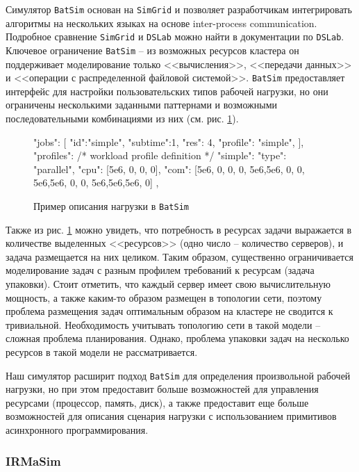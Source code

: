 Симулятор \texttt{BatSim} основан на \texttt{SimGrid}\cite{simgrid-article} и позволяет разработчикам интегрировать алгоритмы на нескольких языках на основе inter-process communication. Подробное сравнение \texttt{SimGrid} и \texttt{DSLab} можно найти в документации по \texttt{DSLab}\cite{dslab-analog-cmp}. Ключевое ограничение \texttt{BatSim} -- из возможных ресурсов кластера он поддерживает моделирование только <<вычисления>>, <<передачи данных>> и <<операции с распределенной файловой системой>>. \texttt{BatSim} предоставляет интерфейс для настройки пользовательских типов рабочей нагрузки, но они ограничены несколькими заданными паттернами и возможными последовательными комбинациями из них (см. рис. \ref{fig:batsim-profile}). 

\begin{figure}[h]
    \footnotesize  
\begin{jsoncode}
"jobs": [
  {"id":"simple", "subtime":1, "res": 4, "profile": "simple"},
],
"profiles": {
  /* workload profile definition */
  "simple": {
    "type": "parallel",
    "cpu": [5e6,  0,  0,  0],
    "com": [5e6,  0,  0,  0,
            5e6,5e6,  0,  0,
            5e6,5e6,  0,  0,
            5e6,5e6,5e6,  0]
  },
}
\end{jsoncode}
\caption{Пример описания нагрузки в \texttt{BatSim}}
\label{fig:batsim-profile}
\end{figure}

Также из рис. \ref{fig:batsim-profile} можно увидеть, что потребность в ресурсах задачи выражается в количестве выделенных <<ресурсов>> (одно число -- количество серверов), и задача размещается на них целиком. Таким образом, существенно ограничивается моделирование задач с разным профилем требований к ресурсам (задача упаковки). Стоит отметить, что каждый сервер имеет свою вычислительную мощность, а также каким-то образом размещен в топологии сети, поэтому проблема размещения задач оптимальным образом на кластере не сводится к тривиальной. Необходимость учитывать топологию сети в такой модели -- сложная проблема планирования. Однако, проблема упаковки задач на несколько ресурсов в такой модели не рассматривается.

Наш симулятор расширит подход \texttt{BatSim} для определения произвольной рабочей нагрузки, но при этом предоставит больше возможностей для управления ресурсами (процессор, память, диск), а также предоставит еще больше возможностей для описания сценария нагрузки с использованием примитивов асинхронного программирования.

\subsubsection{IRMaSim}

